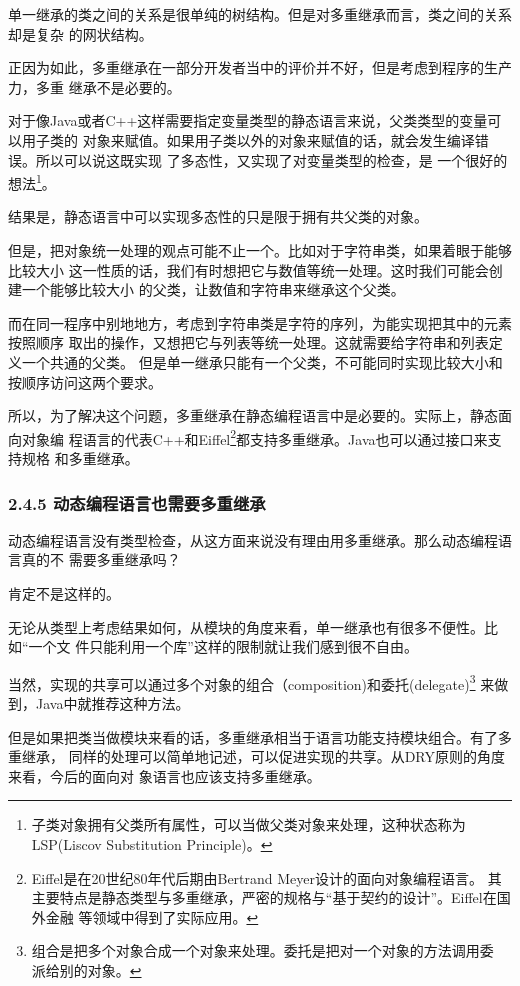 \documentclass[11pt]{ctexart}
\begin{document}
单一继承的类之间的关系是很单纯的树结构。但是对多重继承而言，类之间的关系却是复杂
的网状结构。

正因为如此，多重继承在一部分开发者当中的评价并不好，但是考虑到程序的生产力，多重
继承不是必要的。

对于像Java或者C++这样需要指定变量类型的静态语言来说，父类类型的变量可以用子类的
对象来赋值。如果用子类以外的对象来赋值的话，就会发生编译错误。所以可以说这既实现
了多态性，又实现了对变量类型的检查，是 一个很好的想法\footnote{子类对象拥有父类所有属性，可以当做父类对象来处理，这种状态称为
LSP(Liscov Substitution Principle)。}。

结果是，静态语言中可以实现多态性的只是限于拥有共父类的对象。

但是，把对象统一处理的观点可能不止一个。比如对于字符串类，如果着眼于能够比较大小
这一性质的话，我们有时想把它与数值等统一处理。这时我们可能会创建一个能够比较大小
的父类，让数值和字符串来继承这个父类。

而在同一程序中别地地方，考虑到字符串类是字符的序列，为能实现把其中的元素按照顺序
取出的操作，又想把它与列表等统一处理。这就需要给字符串和列表定义一个共通的父类。
但是单一继承只能有一个父类，不可能同时实现比较大小和按顺序访问这两个要求。

所以，为了解决这个问题，多重继承在静态编程语言中是必要的。实际上，静态面向对象编
程语言的代表C++和Eiffel\footnote{Eiffel是在20世纪80年代后期由Bertrand Meyer设计的面向对象编程语言。
其主要特点是静态类型与多重继承，严密的规格与“基于契约的设计”。Eiffel在国外金融
等领域中得到了实际应用。}都支持多重继承。Java也可以通过接口来支持规格
和多重继承。
\subsubsection{2.4.5 动态编程语言也需要多重继承}
\label{sec:org5601d20}

动态编程语言没有类型检查，从这方面来说没有理由用多重继承。那么动态编程语言真的不
需要多重继承吗？

肯定不是这样的。

无论从类型上考虑结果如何，从模块的角度来看，单一继承也有很多不便性。比如“一个文
件只能利用一个库”这样的限制就让我们感到很不自由。

当然，实现的共享可以通过多个对象的组合（composition)和委托(delegate)\footnote{组合是把多个对象合成一个对象来处理。委托是把对一个对象的方法调用委
派给别的对象。}
来做到，Java中就推荐这种方法。

但是如果把类当做模块来看的话，多重继承相当于语言功能支持模块组合。有了多重继承，
同样的处理可以简单地记述，可以促进实现的共享。从DRY原则的角度来看，今后的面向对
象语言也应该支持多重继承。
\end{document}
